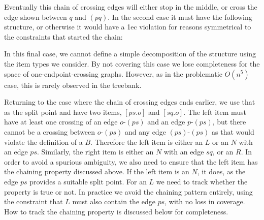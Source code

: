 Eventually this chain of crossing edges will either stop in the middle, or cross the edge shown between $q$ and $(pq)$.
In the second case it must have the following structure, or otherwise it would have a 1ec violation for reasons symmetrical to the constraints that started the chain:

\begin{center}
\end{center}

In this final case, we cannot define a simple decomposition of the structure using the item types we consider.
By not covering this case we lose completeness for the space of one-endpoint-crossing graphs.
However, as in the problematic $O(n^5)$ case, this is rarely observed in the treebank.

Returning to the case where the chain of crossing edges ends earlier, we use that as the split point and have two items, $[ps.o]$ and $[sq.o]$.
The left item must have at least one crossing of an edge $o$-$(ps)$ and an edge $p$-$(ps)$, but there cannot be a crossing between $o$-$(ps)$ and any edge $(ps)$-$(ps)$ as that would violate the definition of a $B$.
Therefore the left item is either an $L$ or an $N$ with an edge $ps$.
Similarly, the right item is either an $N$ with an edge $sq$, or an $R$.
In order to avoid a spurious ambiguity, we also need to ensure that the left item has the chaining property discussed above.
If the left item is an $N$, it does, as the edge $ps$ provides a suitable split point.
For an $L$ we need to track whether the property is true or not.
In practice we avoid the chaining pattern entirely, using the constraint that $L$ must also contain the edge $ps$, with no loss in coverage.
How to track the chaining property is discussed below for completeness.

